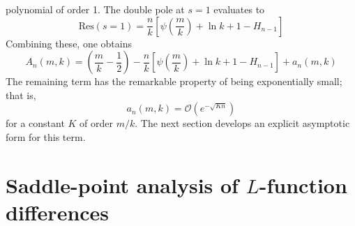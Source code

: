 \documentclass{amsart}
\begin{document}
polynomial of order 1. The double pole at $s=1$ evaluates to\begin{equation}
\mbox{Res}(s=1)=\frac{n}{k}\left[\psi\left(\frac{m}{k}\right)+\ln k+1-H_{n-1}\right]\label{eq:}\end{equation}
 Combining these, one obtains \begin{equation}
A_{n}(m,k)=\left(\frac{m}{k}-\frac{1}{2}\right)-\frac{n}{k}\left[\psi\left(\frac{m}{k}\right)+\ln k+1-H_{n-1}\right]+a_{n}(m,k)\label{eq:}\end{equation}
 The remaining term has the remarkable property of being exponentially
small; that is, \begin{equation}
a_{n}(m,k)=\mathcal{O}\left(e^{-\sqrt{Kn}}\right)\label{eq:}\end{equation}
 for a constant $K$ of order $m/k$. The next section develops an
explicit asymptotic form for this term.


\section{Saddle-point analysis of $L$-function differences}
\end{document}

